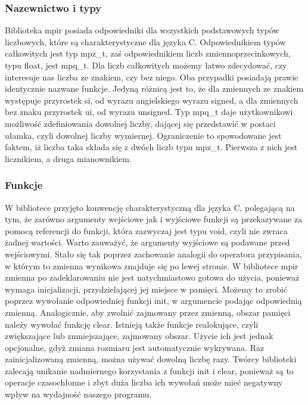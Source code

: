 \documentclass[oneside,a4paper]{book}
\begin{document}
	\subsubsection{Nazewnictwo i typy}
	
	Biblioteka mpir posiada odpowiedniki dla wszystkich podstawowych typów liczbowych, które są charakterystyczne dla języka C. Odpowiednikiem typów całkowitych jest typ mpz\_t, zaś odpowiednikiem liczb zmiennoprzecinkowych, typu float, jest mpq\_t. Dla liczb całkowitych możemy łatwo zdecydować, czy interesuje nas liczba ze znakiem, czy bez niego. Oba przypadki posiadają prawie identycznie nazwane funkcje. Jedyną różnicą jest to, że dla zmiennych ze znakiem występuje przyrostek si, od wyrazu angielskiego wyrazu signed, a dla zmiennych bez znaku przyrostek ui, od wyrazu unsigned. Typ mpq\_t daje użytkownikowi możliwość zdefiniowania dowolnej liczby, dającej się przedstawić w postaci ułamka, czyli dowolnej liczby wymiernej. Ograniczenie to spowodowane jest faktem, iż liczba taka składa się z dwóch liczb typu mpz\_t. Pierwsza z nich jest licznikiem, a druga mianownikiem.
	
	\subsubsection{Funkcje}
	W bibliotece przyjęto konwencję charakterystyczną dla języka C, polegającą na tym, że zarówno argumenty wejściowe jak i wyjściowe funkcji są przekazywane za pomocą referencji do funkcji, która zazwyczaj jest typu void, czyli nie zwraca żadnej wartości. Warto zauważyć, że argumenty wyjściowe są podawane przed wejściowymi. Stało się tak poprzez zachowanie analogii do operatora przypisania, w którym to zmienna wynikowa znajduje się po lewej stronie.
	W bibliotece mpir zmienna po zadeklarowaniu nie jest natychmiastowo gotowa do użycia, ponieważ wymaga inicjalizacji, przydzielającej jej miejsce w pamięci. Możemy to zrobić poprzez wywołanie odpowiedniej funkcji init, w argumencie podając odpowiednią zmienną. Analogicznie, aby zwolnić zajmowany przez zmienną, obszar pamięci należy wywołać funkcję clear. Istnieją także funkcje realokujące, czyli zwiększające lub zmniejszające, zajmowany obszar. Użycie ich jest jednak opcjonalne, gdyż zmiana rozmiaru jest automatycznie wykrywana. Raz zainicjalizowaną zmienną, można używać dowolną liczbę razy. Twórcy biblioteki zalecają unikanie nadmiernego korzystania z funkcji init i clear, ponieważ są to operacje czasochłonne i zbyt duża liczba ich wywołań może mieć negatywny wpływ na wydajność naszego programu.
	
\end{document}
